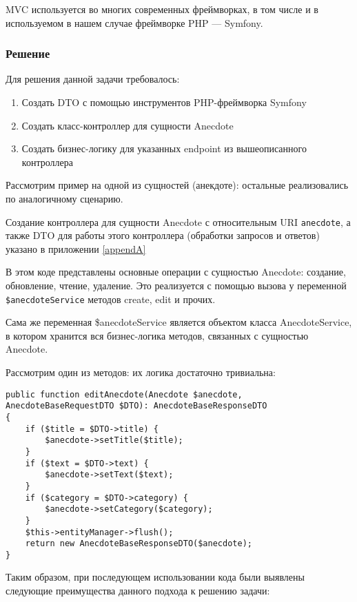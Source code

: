 \documentclass[pract]{SCWorks}
\begin{document}
MVC используется во многих современных фреймворках, в том числе и в
используемом в нашем случае фреймворке PHP — Symfony.

\subsubsection{Решение}

Для решения данной задачи требовалось:

\begin{enumerate}
    \item Создать DTO с помощью инструментов PHP-фреймворка Symfony
    \item Создать класс-контроллер для сущности Anecdote
    \item Создать бизнес-логику для указанных endpoint из вышеописанного
    контроллера
\end{enumerate}

Рассмотрим пример на одной из сущностей (анекдоте): остальные реализовались по
аналогичному сценарию.

Создание контроллера для сущности Anecdote с относительным URI 
\texttt{\/anecdote}, а также DTO для работы этого контроллера (обработки 
запросов и ответов) указано в приложении \ref{appendA}

В этом коде представлены основные операции с сущностью Anecdote: создание,
обновление, чтение, удаление. Это реализуется с помощью вызова у переменной
\texttt{\$anecdoteService} методов create, edit и прочих.

Сама же переменная \$anecdoteService является объектом класса
AnecdoteService, в котором хранится вся бизнес-логика методов, связанных с 
сущностью Anecdote. 

Рассмотрим один из методов: их логика достаточно тривиальна:

\begin{verbatim}
public function editAnecdote(Anecdote $anecdote, AnecdoteBaseRequestDTO $DTO): AnecdoteBaseResponseDTO
{
    if ($title = $DTO->title) {
        $anecdote->setTitle($title);
    }
    if ($text = $DTO->text) {
        $anecdote->setText($text);
    }
    if ($category = $DTO->category) {
        $anecdote->setCategory($category);
    }
    $this->entityManager->flush();
    return new AnecdoteBaseResponseDTO($anecdote);
}
\end{verbatim}

Таким образом, при последующем использовании кода были выявлены следующие
преимущества данного подхода к решению задачи: 
\end{document}
